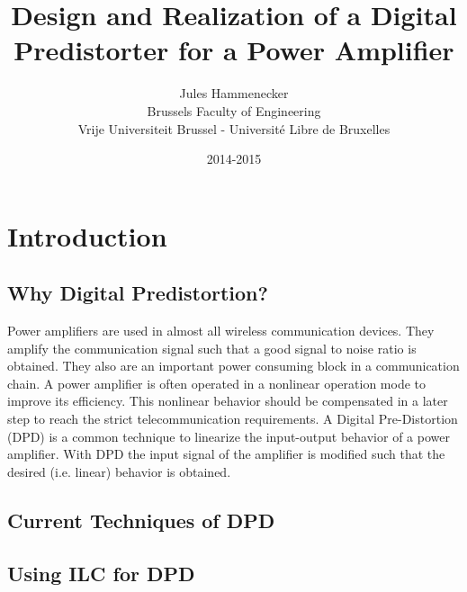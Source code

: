 \documentclass[a4paper]{report}
\begin{document}
\title{Design and Realization of a Digital Predistorter for a Power Amplifier}

\author{Jules Hammenecker \\ Brussels Faculty of Engineering \\ Vrije Universiteit Brussel - Universit\'e Libre de Bruxelles}
\date{2014-2015 }

\maketitle
\begin{abstract}

\end{abstract}

\tableofcontents
\chapter{Introduction}
	\section{Why Digital Predistortion?}
	Power amplifiers are used in almost all wireless communication devices. They amplify the communication signal such that a good signal to noise ratio is obtained. They also are an important power consuming block in a communication chain. A power amplifier is often operated in a nonlinear operation mode to improve its efficiency. This nonlinear behavior should be compensated in a later step to reach the strict telecommunication requirements.
	A Digital Pre-Distortion (DPD) is a common technique to linearize the input-output behavior of a power amplifier. With DPD the input signal of the amplifier is modified such that the desired (i.e. linear) behavior is obtained. 

	\section{Current Techniques of DPD}
	\section{Using ILC for DPD}
\end{document}

